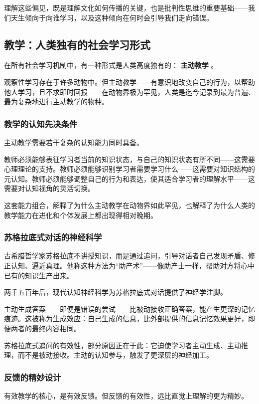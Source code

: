 \documentclass[11pt]{article}
\begin{document}
理解这些偏见，既是理解文化如何传播的关键，也是批判性思维的重要基础——我们天生倾向于向谁学习，以及这种倾向在何时会引导我们走向错误。
\subsection{教学：人类独有的社会学习形式}
\label{sec:org42856b8}

在所有社会学习机制中，有一种形式是人类高度独有的： \textbf{主动教学} 。

观察性学习存在于许多动物中。但主动教学——有意识地改变自己的行为，以帮助他人学习，且不求即时回报——在动物界极为罕见，人类是迄今记录到最为普遍、最为复杂地进行主动教学的物种。
\subsubsection{教学的认知先决条件}
\label{sec:org293db7b}

主动教学需要若干复杂的认知能力同时具备。

教师必须能够表征学习者当前的知识状态，与自己的知识状态有所不同——这需要心理理论的支持。教师必须能够识别学习者需要学习什么——这需要对知识结构的元认知。教师必须能够调整自己的行为和表达，使其适合学习者的理解水平——这需要对认知视角的灵活切换。

这套能力组合，解释了为什么主动教学在动物界如此罕见，也解释了为什么人类的教学能力在进化和个体发展上都出现得相对晚期。
\subsubsection{苏格拉底式对话的神经科学}
\label{sec:org664ea19}

古希腊哲学家苏格拉底不讲授知识，而是通过追问，引导对话者自己发现矛盾、修正认知、逼近真理。他称这种方法为“助产术”——像助产士一样，帮助对方将心中已有的知识生产出来。

两千五百年后，现代认知神经科学为苏格拉底式对话提供了神经学注脚。

主动生成答案——即便是错误的尝试——比被动接收正确答案，能产生更深的记忆痕迹。这被称为生成效应：自己生成的信息，比外部提供的信息记忆效果更好，即便两者的最终内容相同。

苏格拉底式追问的有效性，部分原因正在于此：它迫使学习者主动生成、主动推理，而不是被动接收。主动的认知参与，触发了更深层的神经加工。
\subsubsection{反馈的精妙设计}
\label{sec:org1955177}

有效教学的核心，是有效反馈。但反馈的有效性，远比直觉上理解的更为精妙。
\end{document}

